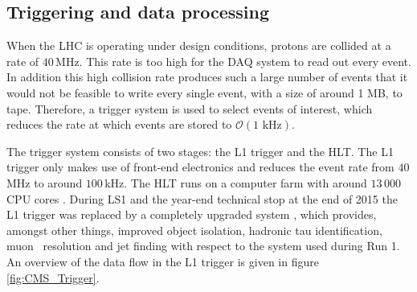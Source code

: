 
\subsection{Triggering and data processing}
\label{sec:CMSLHC_CMS_trigger}
When the \ac{LHC} is operating under design conditions, protons are collided at a rate
of $40\,$MHz. This rate is too high for the \ac{DAQ} system to read out every event. In
addition this high collision rate produces such a large number of events that it would
not be feasible to write every single event, with a size of around 1 MB, to tape. Therefore, a trigger
system is used to select events of interest, which reduces the rate
at which events are stored to  $\mathcal{O}(1 \text{ kHz})$.

The trigger system consists of two stages: the \ac{L1} trigger and the \ac{HLT}. 
The \ac{L1} trigger only makes use of front-end electronics and reduces the event rate 
from $40\,$MHz to around $100\,$kHz. The \ac{HLT} 
runs on a computer farm with around $13\,000$ CPU cores \cite{cms-trigger}.
During \ac{LS1} and the year-end technical stop at the end of 2015 the \ac{L1} trigger was
replaced by a completely upgraded system \cite{cms-trigger-tdr}, which provides, amongst other 
things, improved object isolation, hadronic tau identification, muon \pT~resolution and
jet finding with respect to the system used during Run 1.
An overview of the data flow in the \ac{L1} trigger is given in figure \ref{fig:CMS_Trigger}.

